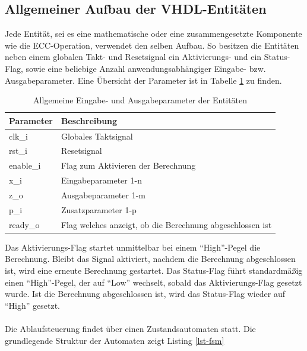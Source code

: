 \subsection{Allgemeiner Aufbau der VHDL-Entitäten}
\label{vhdl-impl-general-entity}

Jede Entität, sei es eine mathematische oder eine zusammengesetzte Komponente wie die ECC-Operation, verwendet den selben Aufbau. So besitzen die Entitäten neben einem globalen Takt- und Resetsignal ein Aktivierungs- und ein Status-Flag, sowie eine beliebige Anzahl anwendungsabhängiger Eingabe- bzw. Ausgabeparameter. Eine Übersicht der Parameter ist in Tabelle \ref{tab:vhdl-impl-ecdsa-general} zu finden. \\

\begin{table} [h]
	\centering 
	\begin{tabular}{ | p{3cm} | p{12cm} | }
		\hline
		\textbf{Parameter} & \textbf{Beschreibung}\\
		\hline
		clk\_i & Globales Taktsignal \\
		\hline
		rst\_i & Resetsignal \\
		\hline
		enable\_i & Flag zum Aktivieren der Berechnung \\
		\hline
		x\_i & Eingabeparameter 1-n \\
		\hline
		z\_o & Ausgabeparameter 1-m \\
		\hline
		p\_i & Zusatzparameter 1-p \\
		\hline
		ready\_o & Flag welches anzeigt, ob die Berechnung abgeschlossen ist \\
		\hline
	\end{tabular}
	\caption{Allgemeine Eingabe- und Ausgabeparameter der Entitäten}
	\label{tab:vhdl-impl-ecdsa-general}
\end{table}

Das Aktivierungs-Flag startet unmittelbar bei einem ``High''-Pegel die Berechnung. Bleibt das Signal aktiviert, nachdem die Berechnung abgeschlossen ist, wird eine erneute Berechnung gestartet. Das Status-Flag führt standardmäßig einen ``High''-Pegel, der auf ``Low'' wechselt, sobald das Aktivierungs-Flag gesetzt wurde. Ist die Berechnung abgeschlossen ist, wird das Status-Flag wieder auf ``High'' gesetzt.
\\ \\
Die Ablaufsteuerung findet über einen Zustandsautomaten statt. Die grundlegende Struktur der Automaten zeigt Listing \ref{lst-fsm}\\ 

